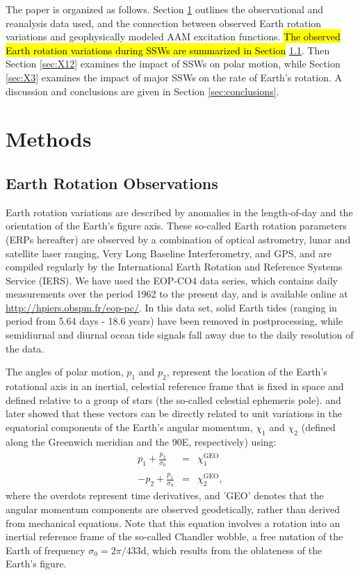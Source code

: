 \documentclass[draft,jgrga]{agutex}
\begin{document}
\begin{article}
The paper is organized as follows.
Section \ref{sec:method} outlines the observational and reanalysis data used, and the connection between observed Earth rotation variations and geophysically modeled AAM excitation functions.
\hl{The observed Earth rotation variations during SSWs are summarized in Section} \ref{sec:ERPobs}. 
Then Section \ref{sec:X12} examines the impact of SSWs on polar motion, while Section \ref{sec:X3}  examines the impact of major SSWs on the rate of Earth's rotation.
A discussion and conclusions are given in Section \ref{sec:conclusions}.


\section{Methods}
\label{sec:method}


\subsection{Earth Rotation Observations}
\label{sec:ERPobs}
 {Earth rotation variations are described by anomalies in the length-of-day and the orientation of the Earth's figure axis. 
These so-called Earth rotation parameters (ERPs hereafter) are observed by a combination of optical astrometry, lunar and satellite laser ranging, Very Long Baseline Interferometry, and GPS, and are compiled regularly by the International Earth Rotation and Reference Systems Service (IERS).}
We have used the EOP-CO4 data series, which contains daily measurements over the period 1962 to the present day, and is available online at \url{http://hpiers.obspm.fr/eop-pc/}.
In this data set, solid Earth tides (ranging in period from 5.64 days - 18.6 years) have been removed in postprocessing, while semidiurnal and diurnal ocean tide signals fall away due to the daily resolution of the data.

 {The angles of polar motion, $p_1$ and $p_2$, represent the location of the Earth's rotational axis in an inertial, celestial reference frame that is fixed in space and defined relative to a group of stars (the so-called celestial ephemeris pole).}
\citet{barnesetal1983} and later \citet{Gross1992}  { showed that these vectors can be directly related to unit variations in 
the equatorial components of the Earth's angular momentum, $\chi_1$ and $\chi_2$ (defined along the Greenwich meridian and the 90\degree E, respectively) using:}
\begin{eqnarray}
  p_1 + \frac{\dot{p_2}}{\sigma_0} &=& \chi_1^{\text{GEO}} \label{eq:PM1_to_AEF} \\
  -p_2 + \frac{\dot{p_1}}{\sigma_0} &=& \chi_2^{\text{GEO}}, \label{eq:PM2_to_AEF}
\end{eqnarray}
 {where the overdots represent time derivatives, and 'GEO' denotes that the angular momentum components are observed geodetically, rather than derived from mechanical equations.}
Note that this equation involves a rotation into an inertial reference frame 
of the so-called Chandler wobble, a free nutation of the Earth of frequency 
$\sigma_0 = 2\pi/ 433\text{d}$, which results from the oblateness of the Earth's figure.



\end{article}
\end{document}
